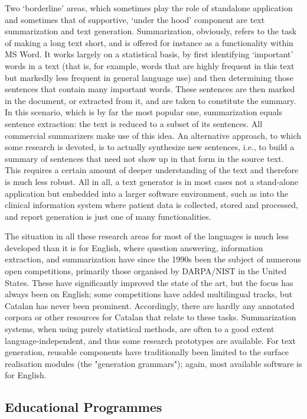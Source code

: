 \documentclass[]{../../metanetpaper}
\begin{document}
\begin{multicols}{2}
Two ‘borderline’ areas, which sometimes play the role of standalone application and sometimes that of supportive, ‘under the hood’ component are text summarization and text generation. Summarization, obviously, refers to the task of making a long text short, and is offered for instance as a functionality within MS Word. It works largely on a statistical basis, by first identifying ‘important’ words in a text (that is, for example, words that are highly frequent in this text but markedly less frequent in general language use) and then determining those sentences that contain many important words. These sentences are then marked in the document, or extracted from it, and are taken to constitute the summary. In this scenario, which is by far the most popular one, summarization equals sentence extraction: the text is reduced to a subset of its sentences. All commercial summarizers make use of this idea. An alternative approach, to which some research is devoted, is to actually synthesize new sentences, i.e., to build a summary of sentences that need not show up in that form in the source text. This requires a certain amount of deeper understanding of the text and therefore is much less robust. All in all, a text generator is in most cases not a stand-alone application but embedded into a larger software environment, such as into the clinical information system where patient data is collected, stored and processed, and report generation is just one of many functionalities.

The situation in all these research areas for most of the languages is much less developed than it is for English, where question answering, information extraction, and summarization have since the 1990s been the subject of numerous open competitions, primarily those organised by DARPA/NIST in the United States. These have significantly improved the state of the art, but the focus has always been on English; some competitions have added multilingual tracks, but Catalan has never been prominent. Accordingly, there are hardly any annotated corpora or other resources for Catalan that relate to these tasks. Summarization systems, when using purely statistical methods, are often to a good extent language-independent, and thus some research prototypes are available. For text generation, reusable components have traditionally been limited to the surface realisation modules (the "generation grammars"); again, most available software is for English.

\subsection{Educational Programmes}


\end{multicols}
\end{document}
